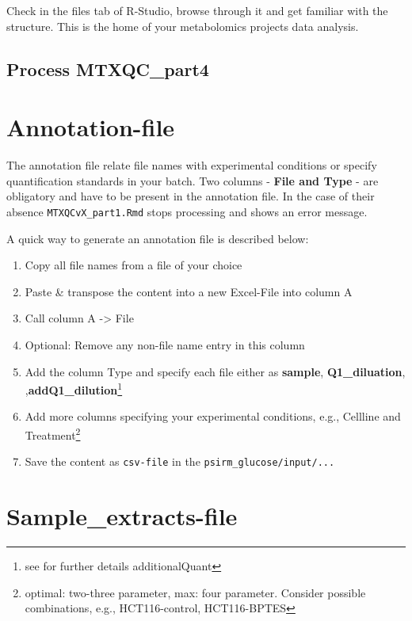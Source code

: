 \documentclass[]{book}
\providecommand{\tightlist}{%
  \setlength{\itemsep}{0pt}\setlength{\parskip}{0pt}}
\let\rmarkdownfootnote\footnote%
\def\footnote{\protect\rmarkdownfootnote}
\theoremstyle{definition}
\theoremstyle{definition}
\theoremstyle{definition}
\theoremstyle{remark}
\begin{document}
Check in the files tab of R-Studio, browse through it and get familiar
with the structure. This is the home of your metabolomics projects data
analysis.

\subsection{Process MTXQC\_part4}\label{process-mtxqc_part4}

\section{Annotation-file}\label{annotation-file}

The annotation file relate file names with experimental conditions or
specify quantification standards in your batch. Two columns -
\textbf{File and Type} - are obligatory and have to be present in the
annotation file. In the case of their absence
\texttt{MTXQCvX\_part1.Rmd} stops processing and shows an error message.

A quick way to generate an annotation file is described below:

\begin{enumerate}
\def\labelenumi{\arabic{enumi}.}
\tightlist
\item
  Copy all file names from a file of your choice
\item
  Paste \& transpose the content into a new Excel-File into column A
\item
  Call column A -\textgreater{} File
\item
  Optional: Remove any non-file name entry in this column
\item
  Add the column Type and specify each file either as \textbf{sample},
  \textbf{Q1\_diluation}, ,\textbf{addQ1\_dilution}\footnote{see for
    further details additionalQuant}
\item
  Add more columns specifying your experimental conditions, e.g.,
  Cellline and Treatment\footnote{optimal: two-three parameter, max:
    four parameter. Consider possible combinations, e.g.,
    HCT116-control, HCT116-BPTES}
\item
  Save the content as \texttt{csv-file} in the
  \texttt{psirm\_glucose/input/...}
\end{enumerate}

\section{Sample\_extracts-file}\label{sample_extracts-file}
\end{document}
